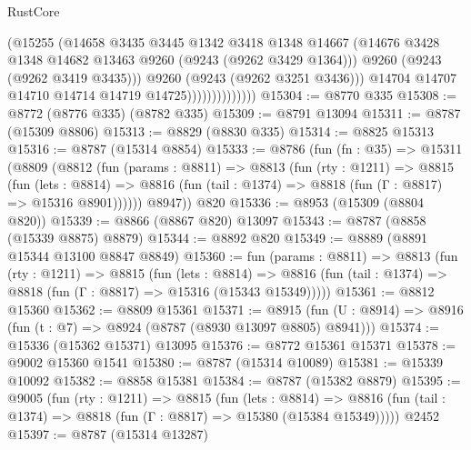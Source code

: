 \begin{lexlean}{RustCore}
\begin{coremodule}
                                (@15255
                                  (@14658
                                    @3435
                                    @3445
                                    @1342
                                    @3418
                                    @1348
                                    @14667
                                    (@14676
                                      @3428
                                      @1348
                                      @14682
                                      @13463
                                      @9260
                                      (@9243 (@9262 @3429 @1364)))
                                    @9260
                                    (@9243 (@9262 @3419 @3435)))
                                  @9260
                                  (@9243 (@9262 @3251 @3436)))
                                @14704
                                @14707
                                @14710
                                @14714
                                @14719
                                @14725))))))))))))))
@15304 := @8770 @335
@15308 := @8772 (@8776 @335) (@8782 @335)
@15309 := @8791 @13094
@15311 := @8787 (@15309 @8806)
@15313 := @8829 (@8830 @335)
@15314 := @8825 @15313
@15316 := @8787 (@15314 @8854)
@15333 := @8786
    (fun (fn : @35) =>
    @15311
      (@8809
        (@8812
          (fun (params : @8811) =>
          @8813
            (fun (rty : @1211) =>
            @8815
              (fun (lets : @8814) =>
              @8816 (fun (tail : @1374) => @8818 (fun (Γ : @8817) => @15316 @8901))))))
        @8947))
    @820
@15336 := @8953 (@15309 (@8804 @820))
@15339 := @8866 (@8867 @820) @13097
@15343 := @8787 (@8858 (@15339 @8875) @8879)
@15344 := @8892 @820
@15349 := @8889 (@8891 @15344 @13100 @8847 @8849)
@15360 := fun (params : @8811) =>
  @8813
    (fun (rty : @1211) =>
    @8815
      (fun (lets : @8814) =>
      @8816 (fun (tail : @1374) => @8818 (fun (Γ : @8817) => @15316 (@15343 @15349)))))
@15361 := @8812 @15360
@15362 := @8809 @15361
@15371 := @8915
    (fun (U : @8914) => @8916 (fun (t : @7) => @8924 (@8787 (@8930 @13097 @8805) @8941)))
@15374 := @15336 (@15362 @15371) @13095
@15376 := @8772 @15361 @15371
@15378 := @9002 @15360 @1541
@15380 := @8787 (@15314 @10089)
@15381 := @15339 @10092
@15382 := @8858 @15381
@15384 := @8787 (@15382 @8879)
@15395 := @9005
    (fun (rty : @1211) =>
    @8815
      (fun (lets : @8814) =>
      @8816 (fun (tail : @1374) => @8818 (fun (Γ : @8817) => @15380 (@15384 @15349)))))
    @2452
@15397 := @8787 (@15314 @13287)

\end{coremodule}
\end{lexlean}
